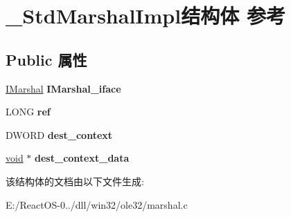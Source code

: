 \hypertarget{struct___std_marshal_impl}{}\section{\+\_\+\+Std\+Marshal\+Impl结构体 参考}
\label{struct___std_marshal_impl}
\subsection*{Public 属性}
\begin{DoxyCompactItemize}
\item 
\mbox{\label{struct___std_marshal_impl_aafc49323796b9fc10e1e4c4bc93ebbba}} 
\hyperlink{interface_i_marshal}{I\+Marshal} {\bfseries I\+Marshal\+\_\+iface}
\item 
\mbox{\label{struct___std_marshal_impl_a4b218a866b28ed724f553a9e371ed858}} 
L\+O\+NG {\bfseries ref}
\item 
\mbox{\label{struct___std_marshal_impl_a6a4ce351a7f7c8a95abb844da785577e}} 
D\+W\+O\+RD {\bfseries dest\+\_\+context}
\item 
\mbox{\label{struct___std_marshal_impl_a6c1538e45609a8844a11abd1df44dc0d}} 
\hyperlink{interfacevoid}{void} $\ast$ {\bfseries dest\+\_\+context\+\_\+data}
\end{DoxyCompactItemize}


该结构体的文档由以下文件生成\+:\begin{DoxyCompactItemize}
\item 
E\+:/\+React\+O\+S-\/0../dll/win32/ole32/marshal.\+c\end{DoxyCompactItemize}
